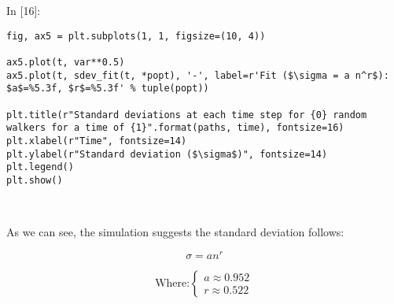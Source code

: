 \documentclass[11pt]{article}
\newif\ifcode
\newif\ifleftmargins
\newlength{\promptlength}
\newcommand{\prompt}[3]{
        \needspace{1.1cm}
        \settowidth{\promptlength}{ #1 [#3] }
        \ifleftmargins\hspace{-\promptlength}\hspace{-5pt}\fi
        {\color{#2}#1 [#3]:}
        \ifleftmargins\vspace{-2.7ex}\fi
    }
\begin{document}
    
\prompt{In}{incolor}{16}
\codetrue
\begin{tcolorbox}[breakable, size=fbox, boxrule=1pt, pad at break*=1mm, colback=cellbackground, colframe=cellborder]
\begin{verbatim}
fig, ax5 = plt.subplots(1, 1, figsize=(10, 4))

ax5.plot(t, var**0.5)
ax5.plot(t, sdev_fit(t, *popt), '-', label=r'Fit ($\sigma = a n^r$): $a$=%5.3f, $r$=%5.3f' % tuple(popt))

plt.title(r"Standard deviations at each time step for {0} random walkers for a time of {1}".format(paths, time), fontsize=16)    
plt.xlabel(r"Time", fontsize=14)
plt.ylabel(r"Standard deviation ($\sigma$)", fontsize=14)
plt.legend()
plt.show()
\end{verbatim}
\end{tcolorbox}
\codefalse

    \begin{center}
    \end{center}
    { \hspace*{\fill} \\}
    
    As we can see, the simulation suggests the standard deviation follows:

\[\sigma = an^r\]

\[\text{Where:} 
  \left\{ \begin{array}{ll}
      a \approx 0.952 \\
      r \approx 0.522
  \end{array} \right.\]


    
    
    
    
\end{document}
